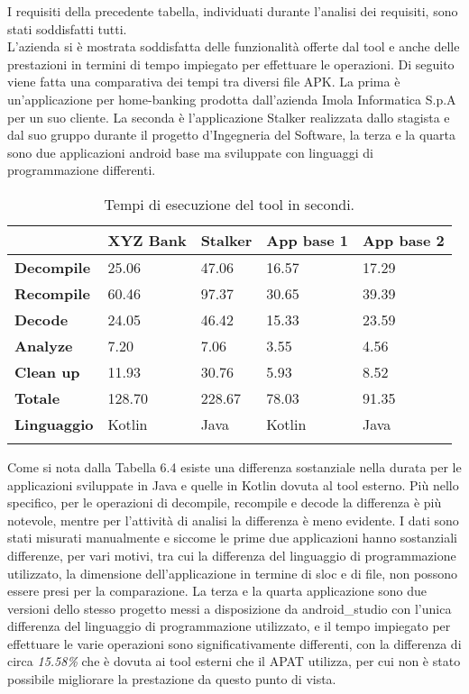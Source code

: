 I requisiti della precedente tabella, individuati durante l'analisi dei requisiti, sono stati soddisfatti tutti.\\
L'azienda si è mostrata soddisfatta delle funzionalità offerte dal tool e anche delle prestazioni in termini di tempo impiegato per effettuare le operazioni.
Di seguito viene fatta una comparativa dei tempi tra diversi file APK. La prima è un'applicazione
per home-banking prodotta dall'azienda Imola Informatica S.p.A per un suo cliente.
La seconda è l'applicazione Stalker realizzata dallo stagista e dal suo gruppo durante il progetto d'Ingegneria del Software, la terza e la quarta sono due applicazioni android base ma sviluppate con linguaggi di programmazione differenti.

\begin{longtable}{| C{2cm}| C{2cm}| C{2.5cm}| C{2.5cm}| C{2.5cm}|}
    \hline
    & \textbf{XYZ Bank} & \textbf{Stalker} & \textbf{App base 1} & \textbf{App base 2} \\\hline
    \textbf{Decompile}  & 25.06             & 47.06            & 16.57               & 17.29               \\\hline
    \textbf{Recompile}  & 60.46             & 97.37            & 30.65               & 39.39               \\\hline
    \textbf{Decode}     & 24.05             & 46.42            & 15.33               & 23.59               \\\hline
    \textbf{Analyze}    & 7.20              & 7.06             & 3.55                & 4.56                \\\hline
    \textbf{Clean up}   & 11.93             & 30.76            & 5.93                & 8.52                \\\hline
    \textbf{Totale}     & 128.70            & 228.67           & 78.03               & 91.35               \\\hline
    \textbf{Linguaggio} & Kotlin            & Java             & Kotlin              & Java                \\\hline
    \caption{Tempi di esecuzione del tool in secondi.}
\end{longtable}
Come si nota dalla Tabella 6.4 esiste una differenza sostanziale nella durata per
le applicazioni sviluppate in Java e quelle in Kotlin dovuta al
tool esterno.
Più nello specifico, per le operazioni di decompile, recompile e decode la differenza è più notevole, mentre per l'attività di analisi la differenza è meno evidente.
I dati sono stati misurati manualmente e siccome le prime due applicazioni hanno sostanziali differenze, per vari motivi, tra cui la differenza del linguaggio di programmazione utilizzato, la dimensione dell'applicazione in termine di \gls{sloc} e di file, non possono essere presi per la comparazione.
La terza e la quarta applicazione sono due versioni dello stesso progetto messi a disposizione da \gls{android_studio} con
l'unica differenza del linguaggio di programmazione utilizzato, e il tempo impiegato per effettuare le varie operazioni sono significativamente differenti, con la differenza di circa \textit{15.58\%} che è dovuta ai tool esterni che il APAT utilizza, per cui non è stato possibile migliorare la prestazione da questo punto di vista.
